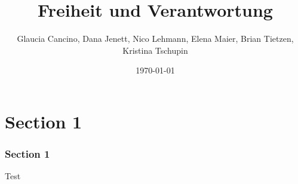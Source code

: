 \documentclass[12pt]{beamer}
\begin{document}
\title{Freiheit und Verantwortung}  
\author{Glaucia Cancino, Dana Jenett, Nico Lehmann, Elena Maier, Brian Tietzen, Kristina Tschupin}
\date{\today} 

\frame{\titlepage} 



\section{Section 1} 
\begin{frame}
\frametitle{Section 1}
Test
\end{frame}
\end{document}
